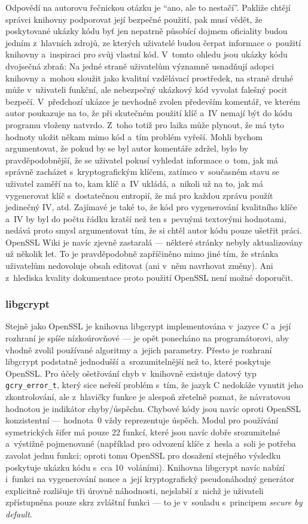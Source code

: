 Odpovědí na autorovu řečnickou otázku je ``ano, ale to nestačí''. Pakliže chtějí správci knihov\-ny podporovat její bezpečné použití, pak musí vědět, že poskytované ukázky kódu byť jen ne\-pa\-tr\-ně působící dojmem oficiality budou jedním z~hlavních zdrojů, ze kterých uživatelé budou čer\-pat informace o~použití knihovny a~inspiraci pro svůj vlastní kód. V~tomto ohledu jsou ukázky kódu dvojsečná zbraň: Na jedné straně uživatelům významně usnadňují adopci knihovny a~mohou sloužit jako kvalitní vzdělávací prostředek, na straně druhé může v~uživateli funkční, ale nebezpečný ukázkový kód vyvolat falešný pocit bezpečí. V~předchozí ukázce je nevhodně zvo\-len především komentář, ve kterém autor poukazuje na to, že při skutečném použití klíč a~IV nemají být do kódu programu vloženy natvrdo. Z~toho totiž pro laika může plynout, že má tyto hodnoty uložit někam mimo kód a~tím problém vyřeší. Mohli bychom argumentovat, že pokud by se byl autor komentáře zdržel, bylo by prav\-dě\-po\-dob\-něj\-ší, že se uživatel pokusí vyhledat informace o~tom, jak má správně zacházet s~kryptografickým klíčem, zatímco v~současném stavu se uživatel zaměří na to, kam klíč a~IV ukládá, a~nikoli už na to, jak má vygenerovat klíč s~dos\-ta\-teč\-nou en\-tro\-pií, že má pro každou zprávu použít jedinečný IV, atd. Zajímavé je také to, že kód pro vygenerování kvalitního klíče a~IV by byl do počtu řádku kratší než ten s~pevnými tex\-to\-vý\-mi hodnotami, nedává proto smysl argumentovat tím, že si chtěl autor kódu pouze ušetřit práci. Open\-SSL Wiki je navíc zjevně zastaralá --- některé stránky nebyly aktualizovány už několik let. To je pravděpodobně zapříčiněno mimo jiné tím, že stránka uživatelům nedovoluje obsah editovat (ani v~něm navrhovat změny). Ani z~hlediska kvality dokumentace proto použití Open\-SSL není možné doporučit.

\subsubsection*{libgcrypt}

Stejně jako OpenSSL je knihovna libgcrypt implementována v~jazyce C a~její rozhraní je spíše nízkoúrovňové --- je opět ponecháno na programátorovi, aby vhodně zvolil používané algoritmy a~jejich parametry. Přesto je rozhraní libgcrypt podstatně jednodušší a~srozumitelnější než to, které poskytuje OpenSSL. Pro účely ošetřování chyb v~knihovně existuje datový typ \texttt{gcry\_error\_t}, který sice neřeší problém s~tím, že jazyk C nedokáže vynutit jeho zkontrolování, ale z~hlavičky funkce je alespoň zřetelně poznat, že návratovou hodnotou je indikátor chyby/úspěchu. Chybové kódy jsou navíc oproti OpenSSL konzistentní --- hodnota~0 vždy reprezentuje úspěch. Modul pro používání symetrických šifer má pouze 22 funkcí, které jsou navíc dobře srozumitelné a~výstižně pojmenované (například pro odvození klíče z~hesla a~soli je potřeba zavolat jednu funkci; oproti tomu OpenSSL pro dosažení stejného výsledku poskytuje ukázku kódu s~cca 10~voláními). Knihovna libgcrypt navíc nabízí i~funkci na vygenerování nonce a~její kryptografický pseudonáhodný generátor explicitně rozlišuje tři úrovně náhodnosti, nejslabší z~nichž je uživateli zpřístupněna pouze skrz zvláštní funkci --- to je v~souladu s~principem \textit{secure by default}.~\cite{gcrypt-doc}

